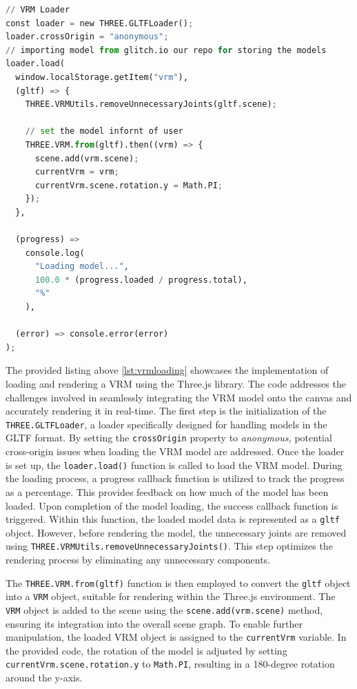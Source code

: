 \begin{lstlisting}[language=Python,caption=Loading the VRM onto the canvas,label=lst:vrmloading]
// VRM Loader
const loader = new THREE.GLTFLoader();
loader.crossOrigin = "anonymous";
// importing model from glitch.io our repo for storing the models
loader.load(
  window.localStorage.getItem("vrm"),
  (gltf) => {
    THREE.VRMUtils.removeUnnecessaryJoints(gltf.scene);

    // set the model infornt of user
    THREE.VRM.from(gltf).then((vrm) => {
      scene.add(vrm.scene);
      currentVrm = vrm;
      currentVrm.scene.rotation.y = Math.PI;
    });
  },

  (progress) =>
    console.log(
      "Loading model...",
      100.0 * (progress.loaded / progress.total),
      "%"
    ),

  (error) => console.error(error)
);
\end{lstlisting}

The provided listing above \ref{lst:vrmloading} showcases the implementation of loading and rendering a VRM using the Three.js library. 
The code addresses the challenges involved in seamlessly integrating the VRM model onto the canvas and accurately rendering it in real-time.
The first step is the initialization of the \texttt{THREE.GLTFLoader}, a loader specifically designed for handling models in the GLTF format. 
By setting the \texttt{crossOrigin} property to \emph{anonymous,} potential cross-origin issues when loading the VRM model are addressed.
Once the loader is set up, the \texttt{loader.load()} function is called to load the VRM model. During the loading process, 
a progress callback function is utilized to track the progress as a percentage. This provides feedback on how much of the model has been loaded.
Upon completion of the model loading, the success callback function is triggered. Within this function, 
the loaded model data is represented as a \texttt{gltf} object. However, before rendering the model, the unnecessary 
joints are removed using \texttt{THREE.VRMUtils.removeUnnecessaryJoints()}. This step optimizes the 
rendering process by eliminating any unnecessary components.

The \texttt{THREE.VRM.from(gltf)} function is then employed to convert the \texttt{gltf} object into a \texttt{VRM} object, 
suitable for rendering within the Three.js environment. The \texttt{VRM} object is added to the scene using 
the \texttt{scene.add(vrm.scene)} method, ensuring its integration into the overall scene graph.
To enable further manipulation, the loaded VRM object is assigned to the \texttt{currentVrm} variable. 
In the provided code, the rotation of the model is adjusted by setting \texttt{currentVrm.scene.rotation.y} to 
\texttt{Math.PI}, resulting in a 180-degree rotation around the y-axis.


